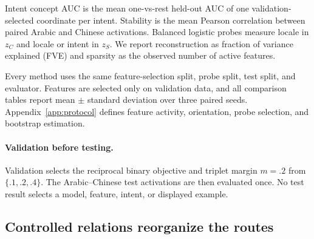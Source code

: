 Intent concept AUC is the mean one-vs-rest held-out AUC \citep{fawcett2006roc} of one validation-selected coordinate per intent. Stability is the mean Pearson correlation \citep{pearson1895regression} between paired Arabic and Chinese activations. Balanced logistic probes \citep{cox1958regression} measure locale in $z_C$ and locale or intent in $z_S$. We report reconstruction as fraction of variance explained (FVE) and sparsity as the observed number of active features.

Every method uses the same feature-selection split, probe split, test split, and evaluator. Features are selected only on validation data, and all comparison tables report mean $\pm$ standard deviation over three paired seeds. Appendix~\ref{app:protocol} defines feature activity, orientation, probe selection, and bootstrap estimation.

\paragraph{Validation before testing.}
Validation selects the reciprocal binary objective and triplet margin $m=.2$ from $\{.1,.2,.4\}$. The Arabic--Chinese test activations are then evaluated once. No test result selects a model, feature, intent, or displayed example.

\subsection{Controlled relations reorganize the routes}

